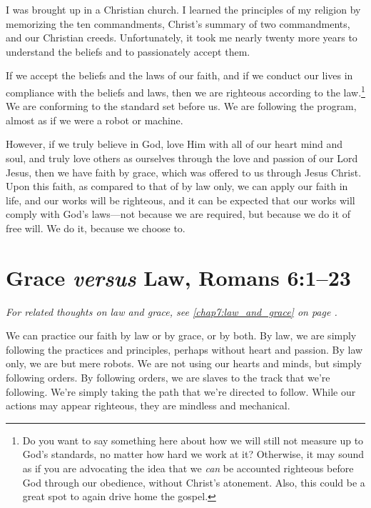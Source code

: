 \documentclass[12pt]{memoir}
\begin{document}
I was brought up in a Christian church. I learned the principles
of my religion by memorizing the ten commandments, Christ's summary
of two commandments, and our Christian creeds. Unfortunately, it took
me nearly twenty more years to understand the beliefs and to passionately
accept them. 

If we accept the beliefs and the laws of our faith, and if we conduct
our lives in compliance with the beliefs and laws, then we are righteous according to the law.\footnote{Do you want to say something here about how we will still not measure up to God's standards, no matter how hard we work at it? Otherwise, it may sound as if you are advocating the idea that we \emph{can} be accounted righteous before God through our obedience, without Christ's atonement. Also, this could be a great spot to again drive home the gospel.} We are conforming to the standard set before us. We
are following the program, almost as if we were a robot or machine.

However, if we truly believe in God, love Him with all of our heart
mind and soul, and truly love others as ourselves through the love
and passion of our Lord Jesus, then we have faith by grace,
which was offered to us through Jesus Christ. Upon this faith, as
compared to that of by law only, we can apply our faith in life,
and our works will be righteous, and it can be expected that our works
will comply with God's laws---not because we are required, but because
we do it of free will. We do it, because we choose to.


\section[Grace \emph{versus} Law]{Grace \emph{versus} Law, Romans 6:1--23}
\label{chap2:law_v_grace}


\begin{center}
\emph{For related thoughts on law and grace, see \ref{chap7:law_and_grace} on page \pageref{chap7:law_and_grace}.}
\end{center}

We can practice our faith by law or by grace, or by both. By law,
we are simply following the practices and principles, perhaps without
heart and passion. By law only, we are but mere robots. We are not
using our hearts and minds, but simply following orders. By following
orders, we are slaves to the track that we're following. We're simply
taking the path that we're directed to follow. While our actions may
appear righteous, they are mindless and mechanical. 
\end{document}
